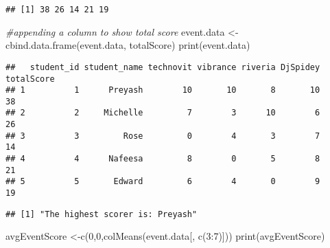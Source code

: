 \documentclass[
]{article}
\newenvironment{Shaded}{\begin{snugshade}}{\end{snugshade}}
\newcommand{\CommentTok}[1]{\textcolor[rgb]{0.56,0.35,0.01}{\textit{#1}}}
\newcommand{\DecValTok}[1]{\textcolor[rgb]{0.00,0.00,0.81}{#1}}
\newcommand{\FunctionTok}[1]{\textcolor[rgb]{0.00,0.00,0.00}{#1}}
\newcommand{\NormalTok}[1]{#1}
\newcommand{\OtherTok}[1]{\textcolor[rgb]{0.56,0.35,0.01}{#1}}
\newcommand{\SpecialCharTok}[1]{\textcolor[rgb]{0.00,0.00,0.00}{#1}}
\newcommand{\StringTok}[1]{\textcolor[rgb]{0.31,0.60,0.02}{#1}}
\begin{document}
\begin{verbatim}
## [1] 38 26 14 21 19
\end{verbatim}

\begin{Shaded}
\begin{Highlighting}[]
\CommentTok{\#appending a column to show total score}
\NormalTok{event.data }\OtherTok{\textless{}{-}} \FunctionTok{cbind.data.frame}\NormalTok{(event.data, totalScore)}
\FunctionTok{print}\NormalTok{(event.data)}
\end{Highlighting}
\end{Shaded}

\begin{verbatim}
##   student_id student_name technovit vibrance riveria DjSpidey totalScore
## 1          1      Preyash        10       10       8       10         38
## 2          2     Michelle         7        3      10        6         26
## 3          3         Rose         0        4       3        7         14
## 4          4      Nafeesa         8        0       5        8         21
## 5          5       Edward         6        4       0        9         19
\end{verbatim}

\begin{Shaded}
\end{Shaded}

\begin{verbatim}
## [1] "The highest scorer is: Preyash"
\end{verbatim}

\begin{Shaded}
\begin{Highlighting}[]
\NormalTok{avgEventScore }\OtherTok{\textless{}{-}}\FunctionTok{c}\NormalTok{(}\DecValTok{0}\NormalTok{,}\DecValTok{0}\NormalTok{,}\FunctionTok{colMeans}\NormalTok{(event.data[, }\FunctionTok{c}\NormalTok{(}\DecValTok{3}\SpecialCharTok{:}\DecValTok{7}\NormalTok{)])) }
\FunctionTok{print}\NormalTok{(avgEventScore)}
\end{Highlighting}
\end{Shaded}
\end{document}
